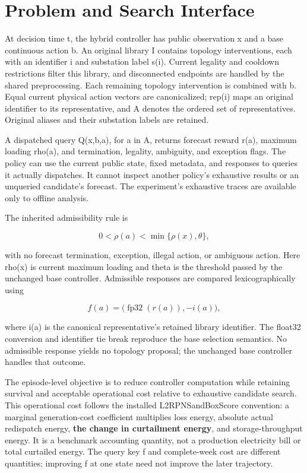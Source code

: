 \section{Problem and Search Interface}

At decision time t, the hybrid controller has public observation x and a base continuous action b. An original library I contains topology interventions, each with an identifier i and substation label s(i). Current legality and cooldown restrictions filter this library, and disconnected endpoints are handled by the shared preprocessing. Each remaining topology intervention is combined with b. Equal current physical action vectors are canonicalized; rep(i) maps an original identifier to its representative, and A denotes the ordered set of representatives. Original aliases and their substation labels are retained.


A dispatched query Q(x,b,a), for a in A, returns forecast reward r(a), maximum loading rho(a), and termination, legality, ambiguity, and exception flags. The policy can use the current public state, fixed metadata, and responses to queries it actually dispatches. It cannot inspect another policy's exhaustive results or an unqueried candidate's forecast. The experiment's exhaustive traces are available only to offline analysis.


The inherited admissibility rule is


\begin{equation}
0 < \rho(a) < \min\{\rho(x),\theta\},
\end{equation}

with no forecast termination, exception, illegal action, or ambiguous action. Here rho(x) is current maximum loading and theta is the threshold passed by the unchanged base controller. Admissible responses are compared lexicographically using


\begin{equation}
f(a)=\bigl(\operatorname{fp32}(r(a)),-i(a)\bigr),
\end{equation}

where i(a) is the canonical representative's retained library identifier. The float32 conversion and identifier tie break reproduce the base selection semantics. No admissible response yields no topology proposal; the unchanged base controller handles that outcome.


The episode-level objective is to reduce controller computation while retaining survival and acceptable operational cost relative to exhaustive candidate search. This operational cost follows the installed L2RPNSandBoxScore convention: a marginal generation-cost coefficient multiplies loss energy, absolute actual redispatch energy, \textbf{the change in curtailment energy}, and storage-throughput energy. It is a benchmark accounting quantity, not a production electricity bill or total curtailed energy. The query key f and complete-week cost are different quantities; improving f at one state need not improve the later trajectory.


